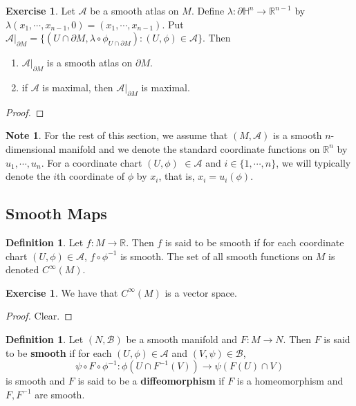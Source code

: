 \documentclass[12pt]{amsart}
\theoremstyle{definition}
\newtheorem{defn}[definition]{Definition}
\newtheorem{note}[definition]{Note}
\theoremstyle{definition}
\newtheorem{ex}[definition]{Exercise}
\newcommand{\lam}{\lambda}
\renewcommand{\H}{\mathbb{H}}
\newcommand{\R}{\mathbb{R}}
\newcommand{\MA}{\mathcal{A}}
\newcommand{\MB}{\mathcal{B}}
\begin{document}
	\begin{ex}
		Let $\MA$ be a smooth atlas on $M$. Define $\lam: \partial \H^n \rightarrow \R^{n-1}$ by $\lam(x_1, \cdots, x_{n-1}, 0) = (x_1, \cdots, x_{n-1})$. Put $\MA|_{\partial M} = \{(U \cap \partial M, \lam \circ \phi_{U \cap \partial M}): (U, \phi) \in \MA\}$. Then 
		\begin{enumerate}
			\item $\MA|_{\partial M}$ is a smooth atlas on $\partial M$.
			\item if $ \MA $ is maximal, then $\MA|_{\partial M}$ is maximal.
		\end{enumerate}
	\end{ex}

	\begin{proof}
		
	\end{proof}
	
	\begin{note}
		For the rest of this section, we assume that $(M, \MA)$ is a smooth $n$-dimensional manifold and we denote the standard coordinate functions on $\R^n$ by $u_1, \cdots, u_n$. For a coordinate chart $(U, \phi)$ $\in \MA$ and $i \in \{1, \cdots, n\}$, we will typically denote the $i$th coordinate of $\phi$ by $x_i$, that is,  $x_i = u_i(\phi)$.
	\end{note}
	
	\newpage 
	
	
	\subsection{Smooth Maps}	
	
	\begin{defn}
		Let $f: M \rightarrow \R$. Then $f$ is said to be smooth if for each coordinate chart $(U, \phi) \in \MA$, $f \circ \phi^{-1}$ is smooth. The set of all smooth functions on $M$ is denoted $C^{\infty}(M)$. 
	\end{defn}

	\begin{ex}
		We have that $C^{\infty}(M)$ is a vector space.
	\end{ex}

	\begin{proof}
		Clear.
	\end{proof}

	\begin{defn}
		Let $(N, \MB)$ be a smooth manifold and $F: M \rightarrow N$. Then $F$ is said to be \textbf{smooth} if for each $(U, \phi) \in \MA$ and $(V, \psi) \in \MB$, $$\psi \circ F \circ \phi^{-1}: \phi(U \cap F^{-1}(V)) \rightarrow \psi(F(U) \cap V)$$ is smooth and $F$ is said to be a \textbf{diffeomorphism} if $F$ is a homeomorphism and $F,F^{-1}$ are smooth.
	\end{defn}
	
\end{document}
